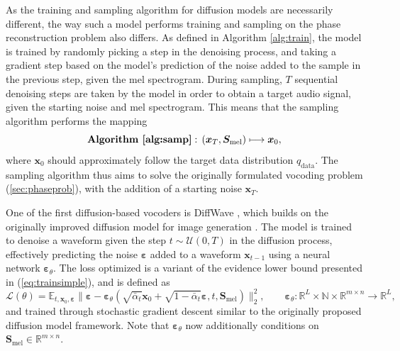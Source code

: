 \documentclass{article}
\begin{document}
As the training and sampling algorithm for diffusion models are necessarily different, the way such a model performs training and sampling on the phase reconstruction problem also differs. As defined in Algorithm \ref{alg:train}, the model is trained by randomly picking a step in the denoising process, and taking a gradient step based on the model's prediction of the noise added to the sample in the previous step, given the mel spectrogram. During sampling, $T$ sequential denoising steps are taken by the model in order to obtain a target audio signal, given the starting noise and mel spectrogram. This means that the sampling algorithm performs the mapping
\begin{equation}
    \textbf{Algorithm \ref{alg:samp}}: \, (\bm{x}_T, \bm{S}_{\text{mel}}) \longmapsto \bm{x}_0,
\end{equation}
where $\bm{x}_0$ should approximately follow the target data distribution $q_{\text{data}}$. The sampling algorithm thus aims to solve the originally formulated vocoding problem (\ref{sec:phaseprob}), with the addition of a starting noise $\bm{x}_T$.

One of the first diffusion-based vocoders is DiffWave \cite{kong2020diffwave}, which builds on the originally improved diffusion model for image generation \cite{ho2020denoising}. The model is trained to denoise a waveform given the step $t \sim \mathcal{U}(0, T)$ in the diffusion process, effectively predicting the noise $\bm{\varepsilon}$ added to a waveform $\bm{x}_{t-1}$ using a neural network $\bm{\varepsilon}_{\theta}$. The loss optimized is a variant of the evidence lower bound presented in (\ref{eq:trainsimple}), and is defined as
\begin{equation} \label{eq:vocloss}
    \mathcal{L}(\theta) = \mathbb{E}_{t, \bm{x}_0, \bm{\varepsilon}} \| \bm{\varepsilon} - \bm{\varepsilon}_{\theta}(\sqrt{\bar{\alpha}_t} \bm{x}_0 + \sqrt{1 - \bar{\alpha}_t}\bm{\varepsilon}, t, \bm{S}_{\text{mel}}) \|_2^2, \qquad \bm{\varepsilon}_{\theta}: \mathbb{R}^L \times \mathbb{N} \times \mathbb{R}^{m \times n} \rightarrow \mathbb{R}^L,
\end{equation}
and trained through stochastic gradient descent similar to the originally proposed diffusion model framework. Note that $\bm{\varepsilon}_{\theta}$ now additionally conditions on $\bm{S}_{\text{mel}} \in \mathbb{R}^{m \times n}$.
\end{document}
